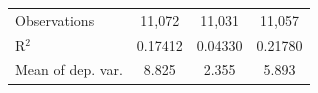 \begin{tabular}{lccc}
   Observations                                                          & 11,072                               & 11,031                                     & 11,057\\  
   R$^2$                                                                 & 0.17412                              & 0.04330                                    & 0.21780\\  
   Mean of dep. var.                                                     & 8.825                                & 2.355                                      & 5.893\\  
\bottomrule
\end{tabular}
